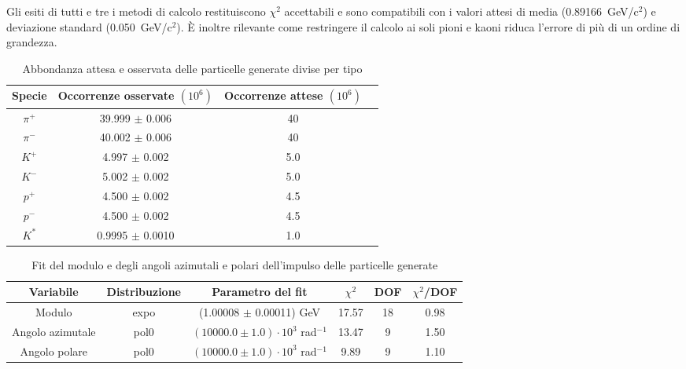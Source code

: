 \documentclass[a4paper,10pt]{article}
\begin{document}
Gli esiti di tutti e tre i metodi di calcolo restituiscono $\chi^2$ accettabili e sono compatibili con i valori attesi di media (0.89166~GeV/c$^2$) e deviazione standard (0.050~GeV/c$^2$). È inoltre rilevante come restringere il calcolo ai soli pioni e kaoni riduca l'errore di più di un ordine di grandezza.

\begin{table*}
  \caption{Abbondanza attesa e osservata delle particelle generate divise per tipo}
  \label{tab:abbondanza}
  \centering
  \begin{tabular}{cccc}
    \toprule
    Specie  & Occorrenze osservate $(10^6)$ & Occorrenze attese $(10^6)$ \\
    \midrule
    $\pi^+$ & 39.999 $\pm$ 0.006            & 40                         \\
    $\pi^-$ & 40.002 $\pm$ 0.006            & 40                         \\
    $K^+$   & 4.997 $\pm$ 0.002             & 5.0                        \\
    $K^-$   & 5.002 $\pm$ 0.002             & 5.0                        \\
    $p^+$   & 4.500 $\pm$ 0.002             & 4.5                        \\
    $p^-$   & 4.500 $\pm$ 0.002             & 4.5                        \\
    $K^*$   & 0.9995 $\pm$ 0.0010           & 1.0                        \\
    \bottomrule
  \end{tabular}
\end{table*}


\begin{table*}[p]
  \caption{Fit del modulo e degli angoli azimutali e polari dell'impulso delle particelle generate}
  \label{tab:fit}
  \centering
  \begin{tabular}{cccccc}
    \toprule
    Variabile        & Distribuzione & Parametro del fit                         & $\chi^2$ & DOF & $\chi^2$/DOF \\
    \midrule
    Modulo           & expo          & (1.00008 $\pm$ 0.00011) GeV               & 17.57    & 18  & 0.98         \\
    \midrule
    Angolo azimutale & pol0          & $(10000.0 \pm 1.0) \cdot 10^3$ rad$^{-1}$ & 13.47    & 9   & 1.50         \\
    Angolo polare    & pol0          & $(10000.0 \pm 1.0) \cdot 10^3$ rad$^{-1}$ & 9.89     & 9   & 1.10         \\
    \bottomrule
  \end{tabular}
\end{table*}
\end{document}
